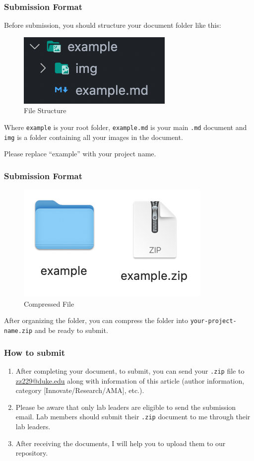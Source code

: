 \documentclass{beamer}
\begin{document}
\begin{frame}[fragile]
    \frametitle{Submission Format}

    Before submission, you should structure your document folder like this:

    \begin{figure}[!htbp]
        \centering
        \includegraphics[width=.2\textwidth]{img/file-structure.png}
        \caption{File Structure}
    \end{figure}

    Where \texttt{example} is your root folder, \texttt{example.md} is your main \texttt{.md} document and \texttt{img} is a folder containing all your images in the document. 
    
    Please replace ``example'' with your project name.

\end{frame}

\begin{frame}
    \frametitle{Submission Format}

    \begin{figure}[!htbp]
        \centering
        \includegraphics[width=.3\textwidth]{img/compress.png}
        \caption{Compressed File}
    \end{figure}

    After organizing the folder, you can compress the folder into \texttt{your-project-name.zip} and be ready to submit.

\end{frame}

\begin{frame}
    \frametitle{How to submit}

    \begin{enumerate}
        \item  After completing your document, to submit, you can send your \texttt{.zip} file to \href{mailto:zz229@duke.edu}{zz229@duke.edu} along with information of this article (author information, category [Innovate/Research/AMA], etc.).
        \item Please be aware that only lab leaders are eligible to send the submission email. Lab members should submit their \texttt{.zip} document to me through their lab leaders.
        \item After receiving the documents, I will help you to upload them to our repository.
    \end{enumerate}
\end{frame}
\end{document}
